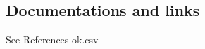 \documentclass[8pt]{article} %
\begin{document}
\subsection{Documentations and links}
See References-ok.csv



 




\end{document}
